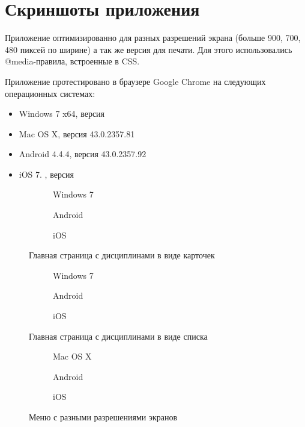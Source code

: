 \section{Скриншоты приложения}

Приложение оптимизированно для разных разрешений экрана (больше 900, 700, 480 пиксей по ширине) а так же версия для печати. Для этого использовались @media-правила, встроенные в CSS.

Приложение протестировано в браузере Google Chrome на следующих операционных системах:
\begin{itemize}
	\item Windows 7 x64, версия
	\item Mac OS X, версия 43.0.2357.81
	\item Android 4.4.4, версия 43.0.2357.92
	\item iOS 7. , версия 
\end{itemize} 

\begin{figure}
	\begin{subfigure}
		\caption{Windows 7}
	\end{subfigure}
	\begin{subfigure}
		\caption{Android}
	\end{subfigure}
	\begin{subfigure}
		\caption{iOS}
	\end{subfigure}
	\caption{Главная страница с дисциплинами в виде карточек}
\end{figure}

\begin{figure}
	\begin{subfigure}
		\caption{Windows 7}
	\end{subfigure}
	\begin{subfigure}
		\caption{Android}
	\end{subfigure}
	\begin{subfigure}
		\caption{iOS}
	\end{subfigure}
	\caption{Главная страница с дисциплинами в виде списка}
\end{figure}

\begin{figure}
	\begin{subfigure}
		\caption{Mac OS X}
	\end{subfigure}
	\begin{subfigure}
		\caption{Android}
	\end{subfigure}
	\begin{subfigure}
		\caption{iOS}
	\end{subfigure}
	\caption{Меню с разными разрешениями экранов}
\end{figure}

